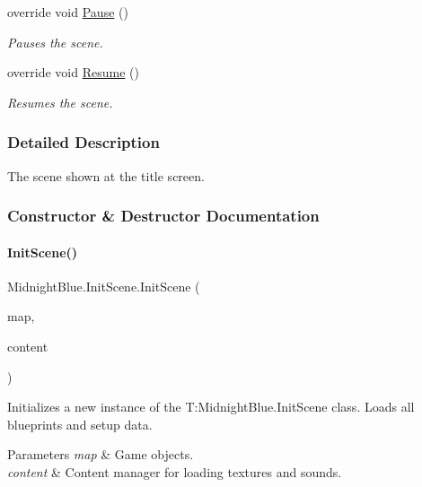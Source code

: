 \begin{DoxyCompactItemize}
override void \hyperlink{class_midnight_blue_1_1_init_scene_adbcab013e715e5c49ad09bcd0545d994}{Pause} ()
\begin{DoxyCompactList}\small\item\em Pauses the scene. \end{DoxyCompactList}\item 
override void \hyperlink{class_midnight_blue_1_1_init_scene_a01ade76252a492d20181bd2e00eb217f}{Resume} ()
\begin{DoxyCompactList}\small\item\em Resumes the scene. \end{DoxyCompactList}\end{DoxyCompactItemize}


\subsubsection{Detailed Description}
The scene shown at the title screen. 



\subsubsection{Constructor \& Destructor Documentation}
\hypertarget{class_midnight_blue_1_1_init_scene_a6458d599d89e074484645974a1975f46}{}\label{class_midnight_blue_1_1_init_scene_a6458d599d89e074484645974a1975f46} 
\paragraph{\texorpdfstring{Init\+Scene()}{InitScene()}}
{\footnotesize\ttfamily Midnight\+Blue.\+Init\+Scene.\+Init\+Scene (\begin{DoxyParamCaption}\item[{Entity\+Map}]{map,  }\item[{Content\+Manager}]{content }\end{DoxyParamCaption})\hspace{0.3cm}{\ttfamily [inline]}}



Initializes a new instance of the T\+:\+Midnight\+Blue.\+Init\+Scene class. Loads all blueprints and setup data. 


\begin{DoxyParams}{Parameters}
{\em map} & Game objects.\\
\hline
{\em content} & Content manager for loading textures and sounds.\\
\hline
\end{DoxyParams}


